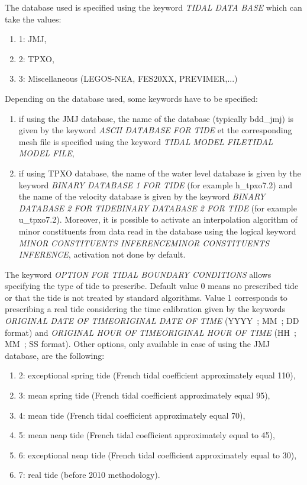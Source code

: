 The database used is specified using the keyword \textit{TIDAL DATA BASE }which can take the values:

\begin{enumerate}
\item  1: JMJ,

\item  2: TPXO,

\item  3: Miscellaneous (LEGOS-NEA, FES20XX, PREVIMER,...)
\end{enumerate}

  Depending on the database used, some keywords have to be specified:

\begin{enumerate}
\item  if using the JMJ database, the name of the database (typically bdd\_jmj) is given by the keyword \textit{ASCII DATABASE FOR TIDE} et the corresponding mesh file is specified using the keyword \textit{TIDAL MODEL FILETIDAL MODEL FILE},

\item  if using TPXO database, the name of the water level database is given by the keyword \textit{BINARY DATABASE 1 FOR TIDE} (for example h\_tpxo7.2) and the name of the velocity database is given by the keyword \textit{BINARY DATABASE 2 FOR TIDEBINARY DATABASE 2 FOR TIDE} (for example u\_tpxo7.2). Moreover, it is possible to activate an interpolation algorithm of minor constituents from data read in the database using the logical keyword \textit{MINOR CONSTITUENTS INFERENCEMINOR CONSTITUENTS INFERENCE}, activation not done by default.
\end{enumerate}

 The keyword \textit{OPTION FOR TIDAL BOUNDARY CONDITIONS }allows specifying the type of tide to prescribe. Default value 0 means no prescribed tide or that the tide is not treated by standard algorithms. Value 1 corresponds to prescribing a real tide considering the time calibration given by the keywords \textit{ORIGINAL DATE OF TIMEORIGINAL DATE OF TIME} (YYYY~; MM~; DD format) and \textit{ORIGINAL HOUR OF TIMEORIGINAL HOUR OF TIME} (HH~; MM~; SS format). Other options, only available in case of using the JMJ database, are the following:

\begin{enumerate}
\item  2: exceptional spring tide (French tidal coefficient approximately equal 110),

\item  3: mean spring tide (French tidal coefficient approximately equal 95),

\item  4: mean tide (French tidal coefficient approximately equal 70),

\item  5: mean neap tide (French tidal coefficient approximately equal to 45),

\item  6: exceptional neap tide (French tidal coefficient approximately equal to 30),

\item  7: real tide (before 2010 methodology).
\end{enumerate}

